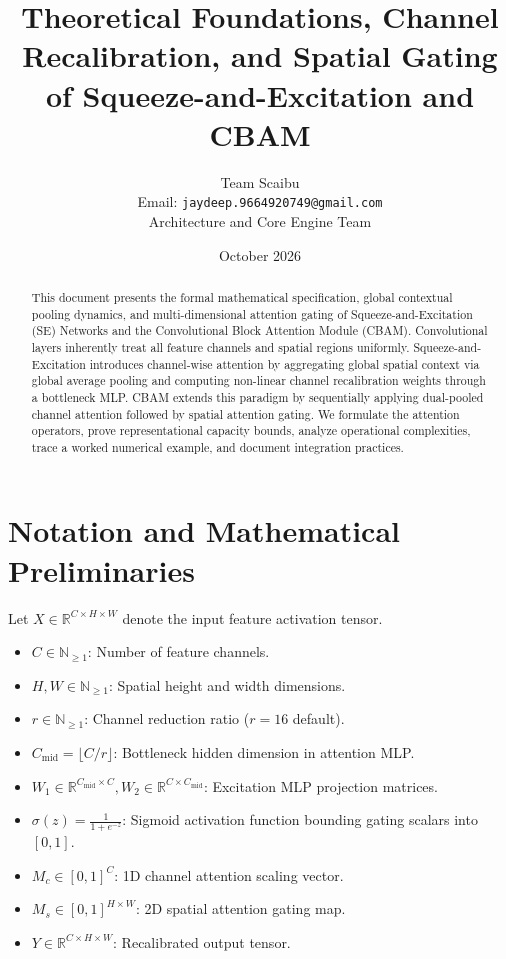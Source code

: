 \documentclass[11pt,a4paper]{article}
\title{\textbf{Theoretical Foundations, Channel Recalibration, and Spatial Gating of Squeeze-and-Excitation and CBAM}}
\author{Team Scaibu \\ \small Email: \texttt{jaydeep.9664920749@gmail.com} \\ \small Architecture and Core Engine Team}
\date{October 2026}
\theoremstyle{definition}
\begin{document}
\maketitle

\begin{abstract}
This document presents the formal mathematical specification, global contextual pooling dynamics, and multi-dimensional attention gating of Squeeze-and-Excitation (SE) Networks and the Convolutional Block Attention Module (CBAM). Convolutional layers inherently treat all feature channels and spatial regions uniformly. Squeeze-and-Excitation introduces channel-wise attention by aggregating global spatial context via global average pooling and computing non-linear channel recalibration weights through a bottleneck MLP. CBAM extends this paradigm by sequentially applying dual-pooled channel attention followed by spatial attention gating. We formulate the attention operators, prove representational capacity bounds, analyze operational complexities, trace a worked numerical example, and document integration practices.
\end{abstract}

\section{Notation and Mathematical Preliminaries}

Let $X \in \mathbb{R}^{C \times H \times W}$ denote the input feature activation tensor.

\begin{itemize}
    \item $C \in \mathbb{N}_{\ge 1}$: Number of feature channels.
    \item $H, W \in \mathbb{N}_{\ge 1}$: Spatial height and width dimensions.
    \item $r \in \mathbb{N}_{\ge 1}$: Channel reduction ratio ($r = 16$ default).
    \item $C_{\text{mid}} = \lfloor C / r \rfloor$: Bottleneck hidden dimension in attention MLP.
    \item $W_1 \in \mathbb{R}^{C_{\text{mid}} \times C}, W_2 \in \mathbb{R}^{C \times C_{\text{mid}}}$: Excitation MLP projection matrices.
    \item $\sigma(z) = \frac{1}{1 + e^{-z}}$: Sigmoid activation function bounding gating scalars into $[0, 1]$.
    \item $M_c \in [0, 1]^C$: 1D channel attention scaling vector.
    \item $M_s \in [0, 1]^{H \times W}$: 2D spatial attention gating map.
    \item $Y \in \mathbb{R}^{C \times H \times W}$: Recalibrated output tensor.
\end{itemize}
\end{document}
